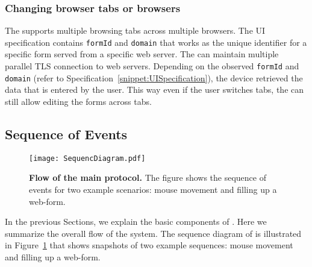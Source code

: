 \subsubsection{\bfseries Changing browser tabs or browsers}
The \device supports multiple browsing tabs across multiple browsers. The UI specification contains \texttt{formId} and \texttt{domain} that works as the unique identifier for a specific form served from a specific web server. The \device can maintain multiple parallel TLS connection to web servers. Depending on the observed \texttt{formId} and \texttt{domain} (refer to Specification~\ref{snippet:UISpecification}), the device retrieved the data that is entered by the user. This way even if the user switches tabs, the \device can still allow editing the forms across tabs.


\subsection{Sequence of Events}
\label{sec:systemDesign:mainProtocol}

\iffalse
\begin{figure}[t]
\centering
\texttt{[image: systemDesign.pdf]}
\caption{\textbf{Flow of the \name main protocol.} The figure shows the high-level protocol flow and the main messages that are exchanged between the remote server, host, \device, and the Io devices.}
\spacesave
\label{fig:systemDesign}
\centering
\end{figure}
\fi

\begin{figure}[t]
\centering
\texttt{[image: SequencDiagram.pdf]}
\caption{\textbf{Flow of the \name main protocol.} The figure shows the
sequence of events for two example scenarios: mouse movement and filling up a
web-form.}
\spacesave
\label{fig:sequence}
\centering
\end{figure}


In the previous Sections, we explain the basic components of \name. Here we
summarize the overall flow of the system. The sequence diagram of \name is
illustrated in Figure~\ref{fig:sequence} that shows snapshots of two example
sequences: mouse movement and filling up a web-form.

